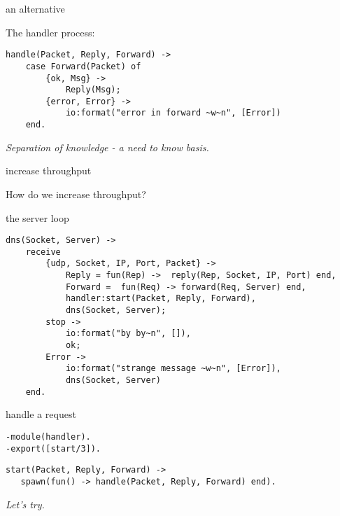 \begin{frame}[fragile]{an alternative}

The handler process:
\pause
\begin{verbatim}
handle(Packet, Reply, Forward) ->    
    case Forward(Packet) of
        {ok, Msg} ->
            Reply(Msg);
        {error, Error} ->
            io:format("error in forward ~w~n", [Error])
    end.
\end{verbatim}

\vspace{10pt}\pause
{\em Separation of knowledge - a need to know basis.}

\end{frame}


\begin{frame}{increase throughput}

How do we increase throughput?

\end{frame}


\begin{frame}[fragile]{the server loop}

\begin{verbatim}
dns(Socket, Server) ->
    receive 
        {udp, Socket, IP, Port, Packet} ->
            Reply = fun(Rep) ->  reply(Rep, Socket, IP, Port) end,
            Forward =  fun(Req) -> forward(Req, Server) end,
            handler:start(Packet, Reply, Forward),
            dns(Socket, Server);
        stop ->
            io:format("by by~n", []),
            ok;
        Error ->
            io:format("strange message ~w~n", [Error]),
            dns(Socket, Server)
    end.
\end{verbatim}

\end{frame}


\begin{frame}[fragile]{handle a request}

\pause

\begin{verbatim}
-module(handler).
-export([start/3]).
\end{verbatim}

\pause
\begin{verbatim}
start(Packet, Reply, Forward) ->
   spawn(fun() -> handle(Packet, Reply, Forward) end).
\end{verbatim}

\pause
{\em Let's try.}
\end{frame}

